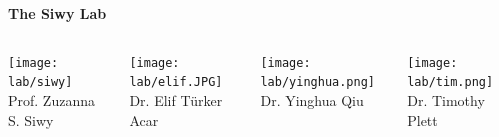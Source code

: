 \begin{frame}[c]{}
	
	{\centering
		{\Large \textcolor{uciblue0}{\textbf{The Siwy Lab}}} \\
		\par
	}
	
	\vspace{-.3in}
	
	\begin{columns}[t]
		
		
		\begin{column}[T]{3.5in}
			
			\vspace{.35in}
			
			\begin{columns}[t]
				\begin{column}[T]{1in}
					{\centering
						\texttt{[image: lab/siwy]} \\
						\vspace{-.1in}
						{\tiny Prof. Zuzanna S. Siwy} \\
						\par
					}
				\end{column}
			
				\begin{column}[T]{1in}
					{\centering
						\texttt{[image: lab/elif.JPG]} \\
						\vspace{-.1in}
						{\tiny Dr. Elif T{\"u}rker Acar} \\
						\par
					}
				\end{column}
			
				\begin{column}[T]{1in}
					{\centering
						\texttt{[image: lab/yinghua.png]} \\
						\vspace{-.1in}
						{\tiny Dr. Yinghua Qiu} \\
						\par
					}
				\end{column}
			
				\begin{column}[T]{1in}
					{\centering
						\texttt{[image: lab/tim.png]} \\
						\vspace{-.1in}
						{\tiny Dr. Timothy Plett} \\
						\par
					}
				\end{column}
				

\end{columns}
\end{column}
\end{columns}
\end{frame}
